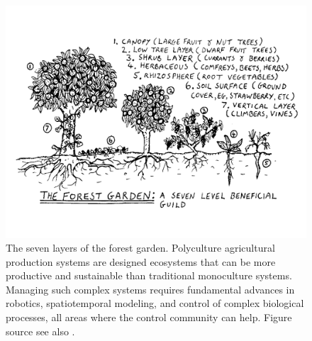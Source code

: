 \documentclass[letterpaper,12pt,peerreviewca,draftcls]{IEEEtran}
\begin{document}
\begin{figure}[tbh]
\includegraphics[width=\textwidth]{"Figure S2"}
\caption{The seven layers of the forest garden. Polyculture agricultural production systems are designed ecosystems that can be more productive and sustainable than traditional monoculture systems. Managing such complex systems requires fundamental advances in robotics, spatiotemporal modeling, and control of complex biological processes, all areas where the control community can help. Figure source \cite{polyculture_fig}  see also \cite{rhodes2012feeding}.}
\label{fig:polycultures}
\end{figure}

\processdelayedfloats







\clearpage
%
\end{document}
